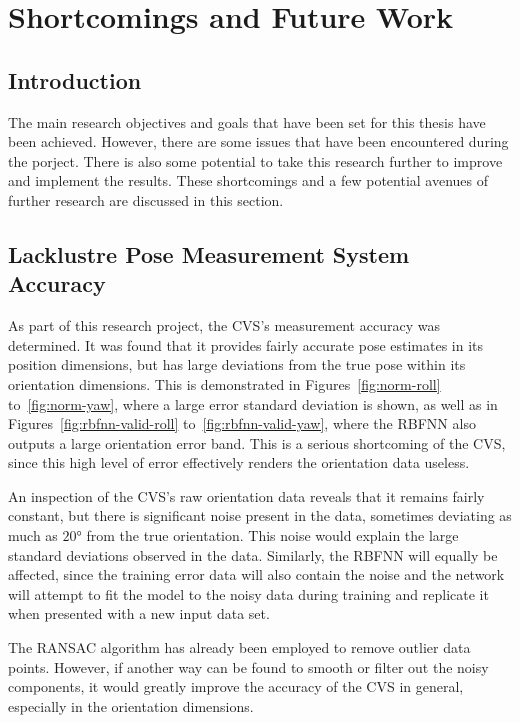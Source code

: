 \section{Shortcomings and Future Work}

\subsection{Introduction}

The main research objectives and goals that have been set for this thesis have been achieved. However, there are some issues that have been encountered during the porject. There is also some potential to take this research further to improve and implement the results. These shortcomings and a few potential avenues of further research are discussed in this section. 

\subsection{Lacklustre Pose Measurement System Accuracy}

As part of this research project, the CVS's measurement accuracy was determined. It was found that it provides fairly accurate pose estimates in its position dimensions, but has large deviations from the true pose within its orientation dimensions. This is demonstrated in Figures~\ref{fig:norm-roll} to~\ref{fig:norm-yaw}, where a large error standard deviation is shown, as well as in Figures~\ref{fig:rbfnn-valid-roll} to~\ref{fig:rbfnn-valid-yaw}, where the RBFNN also outputs a large orientation error band. This is a serious shortcoming of the CVS, since this high level of error effectively renders the orientation data useless. 

An inspection of the CVS's raw orientation data reveals that it remains fairly constant, but there is significant noise present in the data, sometimes deviating as much as $\ang{20}$ from the true orientation. This noise would explain the large standard deviations observed in the data. Similarly, the RBFNN will equally be affected, since the training error data will also contain the noise and the network will attempt to fit the model to the noisy data during training and replicate it when presented with a new input data set. 

The RANSAC algorithm has already been employed to remove outlier data points. However, if another way can be found to smooth or filter out the noisy components, it would greatly improve the accuracy of the CVS in general, especially in the orientation dimensions. 

